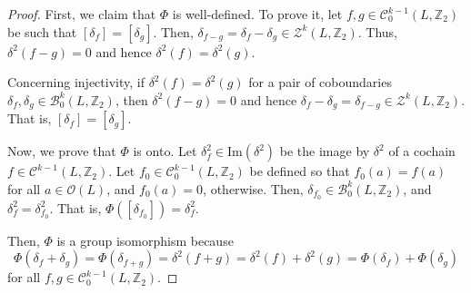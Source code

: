 \documentclass[10pt,a4paper]{amsart}
\begin{document}
\begin{proof} First, we claim that $\Phi$ is well-defined. To prove it, let $f,g\in \mathcal{C}_0^{k-1}(L,\mathbb{Z}_2)$ be such that $[\delta_f]=[\delta_g]$. Then, $\delta_{f-g}=\delta_f-\delta_g\in \mathcal{Z}^k(L,\mathbb{Z}_2)$. Thus, $\delta^2(f-g)=0$ and hence $\delta^2(f)=\delta^2(g)$.

Concerning injectivity, if
$\delta^2(f)=\delta^2(g)$ for a pair of coboundaries $\delta_f,\delta_g\in \mathcal{B}_0^k(L,\mathbb{Z}_2)$, then $\delta^2(f-g)=0$ and hence $\delta_f-\delta_g=\delta_{f-g}\in \mathcal{Z}^k(L,\mathbb{Z}_2)$. That is, $[\delta_f]=[\delta_g]$.

Now, we prove that $\Phi$ is onto. Let $\delta^2_f\in \mathrm{Im}(\delta^2)$ be the image by $\delta^2$ of a cochain $f\in\mathcal{C}^{k-1}(L,\mathbb{Z}_2)$. Let $f_0\in\mathcal{C}_0^{k-1}(L,\mathbb{Z}_2)$ be defined so that $f_0(a)=f(a)$ for all $a\in\mathcal{O}(L)$, and $f_0(a)=0$, otherwise. Then, $\delta_{f_0}\in \mathcal{B}_0^k(L,\mathbb{Z}_2)$, and $\delta^2_f=\delta^2_{f_0}$. That is, $\Phi([\delta_{f_0}])=\delta^2_f$.

Then, $\Phi$ is a group isomorphism because
\[\Phi(\delta_f+\delta_g)=\Phi(\delta_{f+g})=\delta^2(f+g)=\delta^2(f)+\delta^2(g)=\Phi(\delta_f)+\Phi(\delta_g)\]
for all $f,g\in \mathcal{C}_0^{k-1}(L,\mathbb{Z}_2)$.
\end{proof}
\end{document}
